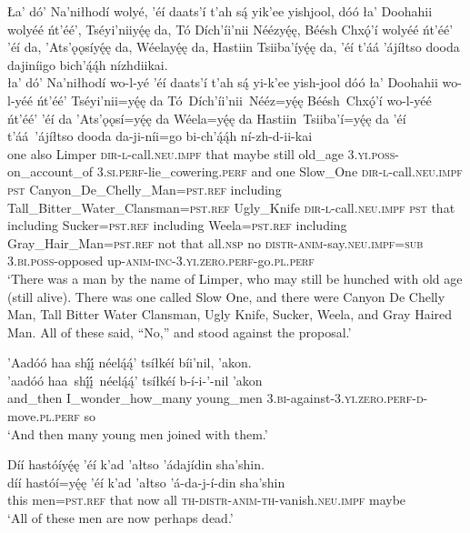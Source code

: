 \ea\label{ex:text3-2-4}
Ła’ dó’ Na’niłhodí wolyé, ’éí daats’í t’ah są́ yik’ee yishjool, dóó ła’ Doohahii wolyéé ńt’éé’, Tséyi’niiyę́ę da, Tó Dích’íi’nii Néézyę́ę, Béésh Chxǫ́’í wolyéé ńt’éé’ ’éí da, ’Ats’ǫǫsíyę́ę da, Wéelayę́ę da, Hastiin Tsiiba’íyę́ę da, ’éí t’áá ’ájíłtso dooda dajiníigo bich’ą́ą́h nízhdiikai.\\
\gll ła’	dó’	Na’niłhodí	wo-l-yé	’éí	daats’í	t’ah	są́	yi-k’ee	yish-jool	dóó	ła’	Doohahii	wo-l-yéé	ńt’éé’	Tséyi’nii=yę́ę	da	Tó~Dích’íi’nii~{Nééz=yę́ę}	Béésh~{Chxǫ́’í}	wo-l-yéé	ńt’éé’	’éí	da	’Ats’ǫǫsí=yę́ę	da	Wéela=yę́ę	da	Hastiin~{Tsiiba’í=yę́ę}	da	’éí	t’áá~{’ájíłtso}	dooda	da-ji-níi=go	bi-ch’ą́ą́h	ní-zh-d-ii-kai\\
     one	also	Limper	\textsc{dir}-\textsc{l}-call.\textsc{neu}.\textsc{impf}	that	maybe	still	old\_age	3.\textsc{yi}.\textsc{poss}-on\_account\_of	3.\textsc{si}.\textsc{perf}-lie\_cowering.\textsc{perf}	and	one	Slow\_One	\textsc{dir}-\textsc{l}-call.\textsc{neu}.\textsc{impf}	\textsc{pst}	Canyon\_De\_Chelly\_Man=\textsc{pst}.\textsc{ref}	including	Tall\_Bitter\_Water\_Clansman=\textsc{pst}.\textsc{ref}	Ugly\_Knife	\textsc{dir}-\textsc{l}-call.\textsc{neu}.\textsc{impf}	\textsc{pst}	that	including	Sucker=\textsc{pst}.\textsc{ref}	including	Weela=\textsc{pst}.\textsc{ref}	including	Gray\_Hair\_Man=\textsc{pst}.\textsc{ref}	not	that	all.\textsc{nsp}	no	\textsc{distr}-\textsc{anim}-say.\textsc{neu}.\textsc{impf}=\textsc{sub}	3.\textsc{bi}.\textsc{poss}-opposed	up-\textsc{anim}-\textsc{inc}-3.\textsc{yi}.\textsc{zero}.\textsc{perf}-go.\textsc{pl}.\textsc{perf}\\
\glt `There was a man by the name of Limper, who may still be hunched with old age (still alive). There was one called Slow One, and there were Canyon De Chelly Man, Tall Bitter Water Clansman, Ugly Knife, Sucker, Weela, and Gray Haired Man. All of these said, ``No,'' and stood against the proposal.'
\z

\ea\label{ex:text3-2-5}
’Aadóó haa shį́į́ néelą́ą́’ tsíłkéí bíi’nil, ’akon.\\
\gll ’aadóó	haa~shį́į́~{néelą́ą́’}	tsíłkéí	b-í-i-’-nil	’akon\\
     and\_then	I\_wonder\_how\_many	young\_men	3.\textsc{bi}-against-3.\textsc{yi}.\textsc{zero}.\textsc{perf}-\textsc{d}-move.\textsc{pl}.\textsc{perf}	so\\
\glt `And then many young men joined with them.'
\z

\ea\label{ex:text3-2-6}
Díí hastóíyę́ę ’éí k’ad ’ałtso ’ádajídin sha’shin.\\
\gll díí	hastóí=yę́ę	’éí	k’ad	’ałtso	’á-da-j-í-din	sha’shin\\
     this	men=\textsc{pst}.\textsc{ref}	that	now	all	\textsc{th}-\textsc{distr}-\textsc{anim}-\textsc{th}-vanish.\textsc{neu}.\textsc{impf}	maybe\\
\glt `All of these men are now perhaps dead.'
\z

